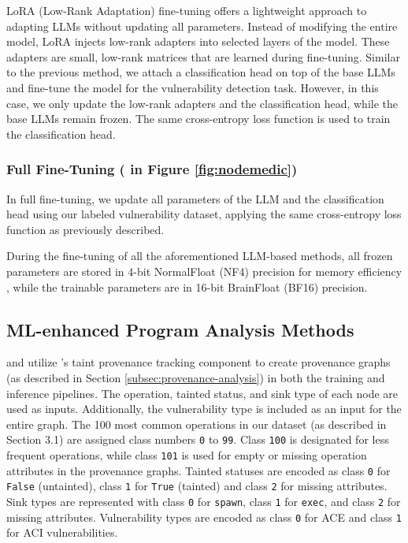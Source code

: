 \documentclass[12pt,openany,oneside,table]{cmuthesis}
\begin{document}
LoRA (Low-Rank Adaptation) fine-tuning \cite{lora, qlora} offers a lightweight approach to adapting LLMs without updating all parameters. Instead of modifying the entire model, LoRA injects low-rank adapters into selected layers of the model. These adapters are small, low-rank matrices that are learned during fine-tuning. Similar to the previous method, we attach a classification head on top of the base LLMs and fine-tune the model for the vulnerability detection task. However, in this case, we only update the low-rank adapters and the classification head, while the base LLMs remain frozen. The same cross-entropy loss function is used to train the classification head.

\subsubsection{Full Fine-Tuning \textup{( in Figure \ref{fig:nodemedic})}}

In full fine-tuning, we update all parameters of the LLM and the classification head using our labeled vulnerability dataset, applying the same cross-entropy loss function as previously described.

During the fine-tuning of all the aforementioned LLM-based methods, all frozen parameters are stored in 4-bit NormalFloat (NF4) precision for memory efficiency \cite{qlora}, while the trainable parameters are in 16-bit BrainFloat (BF16) precision.

\subsection{ML-enhanced Program Analysis Methods}\label{subsec:ml_enhanced}

 and  utilize \nodemedic's
taint provenance tracking component to create provenance graphs (as described in Section \ref{subsec:provenance-analysis}) in both the training and inference pipelines. The operation, tainted status, and sink type of each node are used as inputs. Additionally, the vulnerability type is included as an input for the entire graph. The 100 most common operations in our dataset (as described in Section 3.1) are assigned class numbers \texttt{0} to \texttt{99}. Class \texttt{100} is designated for less frequent operations, while class \texttt{101} is used for empty or missing operation attributes in the provenance graphs. Tainted statuses are encoded as class \texttt{0} for \texttt{False} (untainted), class \texttt{1} for \texttt{True} (tainted) and class \texttt{2} for missing attributes. Sink types are represented with class \texttt{0} for \texttt{spawn}, class \texttt{1} for \texttt{exec}, and class \texttt{2} for missing attributes. Vulnerability types are encoded as class \texttt{0} for ACE and class \texttt{1} for ACI vulnerabilities.
\end{document}
